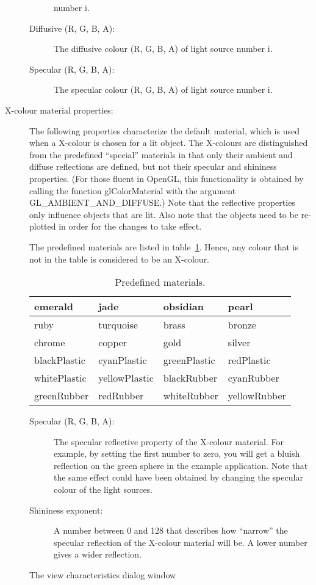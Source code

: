 \documentclass{article}
\newcommand{\figures}{\homeHenshaw/OvertureFigures}
\begin{document}
\begin{description}
\begin{description}
number i.
\item[Diffusive (R, G, B, A):]The diffusive colour (R, G, B, A) of light source
number i.
\item[Specular (R, G, B, A):]The specular colour (R, G, B, A) of light source
number i.
\end{description}
%
\item[X-colour material properties:] The following properties
characterize the default material, which is used when a X-colour is
chosen for a lit object. The X-colours are distinguished from the
predefined ``special'' materials in that only their ambient and
diffuse reflections are defined, but not their specular and shininess
properties. (For those fluent in OpenGL, this functionality is
obtained by calling the function glColorMaterial with the argument
GL\_AMBIENT\_AND\_DIFFUSE.)  Note that the reflective properties only
influence objects that are lit. Also note that the objects need to be
re-plotted in order for the changes to take effect.

The predefined materials are listed in table~\protect\ref{tab:colours}. Hence,
any colour that is not in the table is considered to be an X-colour.
%
\begin{table}[h]
\begin{center}
\begin{tabular}{|l|l|l|l|} \hline
 emerald &  jade & obsidian &  pearl \\ \hline
 ruby &  turquoise &  brass &  bronze \\ \hline
 chrome &  copper &  gold & silver \\ \hline
 blackPlastic &  cyanPlastic &  greenPlastic &  redPlastic \\ \hline 
 whitePlastic &  yellowPlastic &  blackRubber &  cyanRubber \\ \hline
 greenRubber & redRubber &  whiteRubber &  yellowRubber \\ \hline
\end{tabular}
  \caption{Predefined materials.}\label{tab:colours}
\end{center}
\end{table}
%
\begin{description}
\item[Specular (R, G, B, A):]The specular reflective property of the
X-colour material. For example, by setting the first number to
zero, you will get a bluish reflection on the green sphere in the
example application. Note that the same effect could have been
obtained by changing the specular colour of the light sources.
\item[Shininess exponent:]A number between 0 and 128 that describes
how ``narrow'' the specular reflection of the X-colour material will
be. A lower number gives a wider reflection.
\end{description}
%
\end{description}
%
\begin{figure}
  \begin{center}
    \epsfig{file=\figures/viewChar.eps,width=\figWidth}
  \caption{The view characteristics dialog window}\label{fig:view-char}
  \end{center}
\end{figure}
\end{document}
